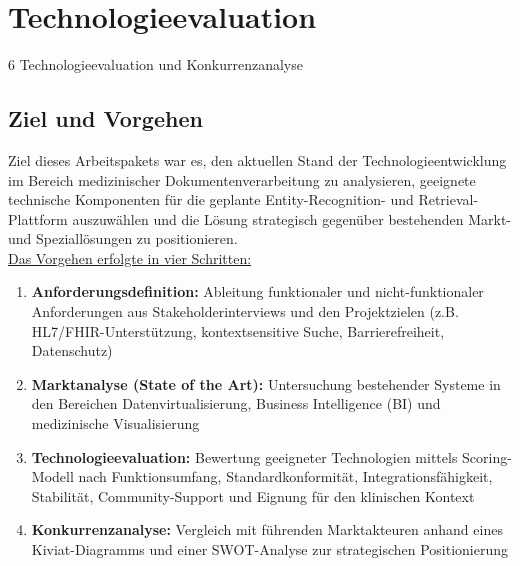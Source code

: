 {\let\clearpage\relax
\chapter{Technologieevaluation}}
\label{sec:technologieevaluation}
6 Technologieevaluation und Konkurrenzanalyse
\section{Ziel und Vorgehen}
Ziel dieses Arbeitspakets war es, den aktuellen Stand der Technologieentwicklung im Bereich medizinischer Dokumentenverarbeitung zu analysieren, geeignete technische Komponenten für die geplante Entity-Recognition- und Retrieval-Plattform auszuwählen und die Lösung strategisch gegenüber bestehenden Markt- und Speziallösungen zu positionieren.\\
\underline{Das Vorgehen erfolgte in vier Schritten:}
\begin{enumerate}
	\item \textbf{Anforderungsdefinition:} Ableitung funktionaler und nicht-funktionaler Anforderungen aus Stakeholderinterviews und den Projektzielen (z.B. HL7/FHIR-Unterstützung, kontextsensitive Suche, Barrierefreiheit, Datenschutz)
	\item \textbf{Marktanalyse (State of the Art):} Untersuchung bestehender Systeme in den Bereichen Datenvirtualisierung, Business Intelligence (BI) und medizinische Visualisierung
	\item \textbf{Technologieevaluation:} Bewertung geeigneter Technologien mittels Scoring-Modell nach Funktionsumfang, Standardkonformität, Integrationsfähigkeit, Stabilität, Community-Support und Eignung für den klinischen Kontext
	\item \textbf{Konkurrenzanalyse:} Vergleich mit führenden Marktakteuren anhand eines Kiviat-Diagramms und einer SWOT-Analyse zur strategischen Positionierung
\end{enumerate}
